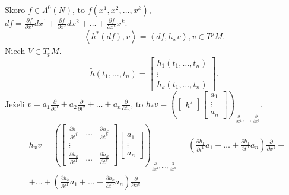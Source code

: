 \documentclass[../main.tex]{subfiles}
\begin{document}

    \begin{dowod}
        Skoro $f\in \Lambda^0(N)$, to $f(x^1,x^2,\ldots,x^k)$,\\
        $df = \frac{\partial f}{\partial x^1} dx^1 + \frac{\partial f}{\partial x^2} dx^2 + \ldots + \frac{\partial f}{\partial x^k} x^k$.
        \[
            \left<h^*(df),v \right> = \left<df,h_xv \right>, v\in T^pM
        .\]
        Niech $V\in T_pM$.\\
        \[
            \tilde h(t_1,\ldots,t_n) = \begin{bmatrix} h_1(t_1,\ldots,t_n)\\ \vdots \\ h_k(t_1,\ldots,t_n) \end{bmatrix}
        .\]
        Jeżeli $v = a_1 \frac{\partial }{\partial t^1} + a_2 \frac{\partial }{\partial t^2} + \ldots + a_n \frac{\partial }{\partial t_n} $, to $h_*v = \left( \begin{bmatrix} h' \end{bmatrix} \begin{bmatrix} a_1\\ \vdots \\ a_n \end{bmatrix}  \right)_{\frac{\partial }{\partial x^1} , \ldots, \frac{\partial }{\partial x^k} } $.\\
        \begin{align*}
            &h_xv = \left( \begin{bmatrix} \frac{\partial h_1}{\partial t^1} & \ldots & \frac{\partial h_k}{\partial t^k} \\ \vdots \\ \frac{\partial h_k}{\partial t^1} & \ldots & \frac{\partial h_k}{\partial t^k}  \end{bmatrix} \begin{bmatrix} a_1 \\ \vdots \\ a_n \end{bmatrix}  \right)_{\frac{\partial }{\partial x^1} ,\ldots, \frac{\partial }{\partial x^k} } = \left( \frac{\partial h_1}{\partial t^1} a_1 + \ldots + \frac{\partial h_1}{\partial t^n} a_n \right) \frac{\partial }{\partial x^1} +\\
&+ \ldots + \left( \frac{\partial h_k}{\partial t^1} a_1 + \ldots + \frac{\partial h_k}{\partial t^n} a_n \right) \frac{\partial }{\partial x^k}

\end{align*}
\end{dowod}
\end{document}

